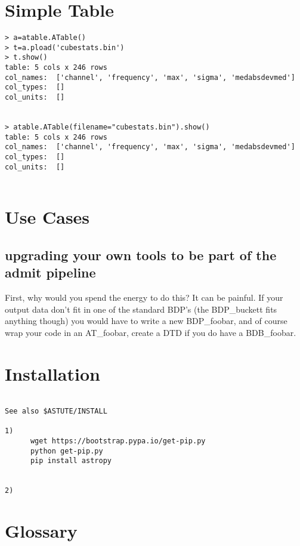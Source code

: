 \documentclass[preprint]{aastex}
\begin{document}
\section{Simple Table}

\footnotesize
\begin{verbatim}
> a=atable.ATable()
> t=a.pload('cubestats.bin')
> t.show()
table: 5 cols x 246 rows
col_names:  ['channel', 'frequency', 'max', 'sigma', 'medabsdevmed']
col_types:  []
col_units:  []


> atable.ATable(filename="cubestats.bin").show()
table: 5 cols x 246 rows
col_names:  ['channel', 'frequency', 'max', 'sigma', 'medabsdevmed']
col_types:  []
col_units:  []


\end{verbatim}
\normalsize

\section{Use Cases}
 
\subsection{upgrading your own tools to be part of the admit pipeline}

First, why would you spend the energy to do this? It can be painful. If your
output data don't fit in one of the standard BDP's (the BDP\_buckett fits anything
though) you would have to write a new BDP\_foobar, and of course wrap your
code in an AT\_foobar, create a DTD if you do have a BDB\_foobar.

\section{Installation}

\begin{verbatim}

See also $ASTUTE/INSTALL

1) 
      wget https://bootstrap.pypa.io/get-pip.py
      python get-pip.py      
      pip install astropy


2)

\end{verbatim}


\section{Glossary}
\end{document}
